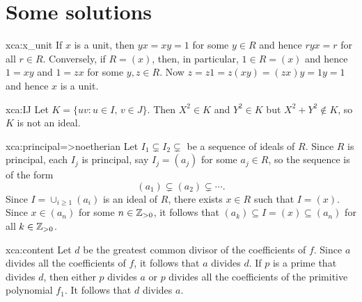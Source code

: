 \chapter*{Some solutions}

\pagestyle{plain}
\fancyhf{}
\fancyfoot[CE,CO]{\leftmark}
\fancyfoot[LE,RO]{\thepage}


\begin{sol}{xca:x_unit}
If $x$ is a unit, then $yx=xy=1$ for some $y\in R$ and hence $ryx=r$ for all $r\in R$. Conversely, 
if $R=(x)$, then, in particular, $1\in R=(x)$ and hence $1=xy$ and $1=zx$ for some $y,z\in R$. Now
$z=z1=z(xy)=(zx)y=1y=1$ and hence $x$ is a unit. 
\end{sol}

\begin{sol}{xca:IJ}
    Let $K=\{uv:u\in I,\,v\in J\}$. Then
    $X^2\in K$ and $Y^2\in K$ but $X^2+Y^2\not\in K$, so $K$ is not an ideal.
\end{sol}

\begin{sol}{xca:principal=>noetherian}
	Let $I_1\subsetneq I_2\subsetneq$ be a sequence of ideals of $R$.  
	Since $R$ is principal, each $I_j$ is principal, 
	say $I_j=(a_j)$ for some $a_j\in R$, so the sequence is of the form
	\[
	(a_1)\subsetneq (a_2)\subsetneq\cdots.
	\]
	Since $I=\cup_{i\geq1}(a_i)$ is an ideal of $R$, 
	there exists $x\in R$ such that $I=(x)$. Since $x\in (a_n)$ for some $n\in\mathbb{Z}_{>0}$, 
	it follows that $(a_k)\subseteq I=(x)\subseteq (a_n)$ for all $k\in\mathbb{Z}_{>0}$. 
\end{sol}

\begin{sol}{xca:content}
	Let $d$ be 
	the greatest common divisor
	of the coefficients of $f$. 
	Since $a$ divides all the coefficients of $f$, it follows that $a$ divides $d$. If $p$ is a prime that
	divides $d$, then either $p$ divides $a$ or $p$ divides all the coefficients of the primitive
	polynomial $f_1$. It follows that $d$ divides $a$.    
\end{sol}

